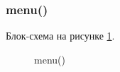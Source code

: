 \subsubsection{menu()}

Блок-схема на рисунке \ref{fig:menu}.

\begin{figure}[p]
    \caption{menu()}
    \label{fig:menu}
\end{figure}





\newpage